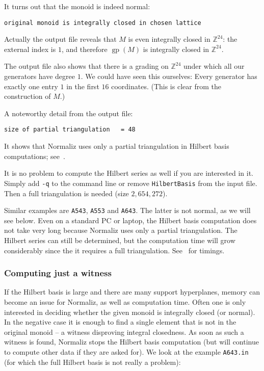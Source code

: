\documentclass[12pt,a4paper]{scrartcl}
\theoremstyle{definition}
\def\ZZ{{\mathbb Z}}
\DeclareMathOperator{\gp}{gp}
\begin{document}
It turns out that the monoid is indeed normal:
\begin{Verbatim}
original monoid is integrally closed in chosen lattice
\end{Verbatim}
Actually the output file reveals that $M$ is even integrally closed in $\ZZ^{24}$: the external index is $1$, and therefore $\gp(M)$ is integrally closed in $\ZZ^{24} $.

The output file also shows that there is a grading on $\ZZ^{24}$ under which all our generators have degree $1$. We could have seen this ourselves: Every generator has exactly one entry $1$ in the first $16$ coordinates. (This is clear from the construction of $M$.)

A noteworthy detail from the output file:
\begin{Verbatim}
size of partial triangulation   = 48
\end{Verbatim}
It shows that Normaliz uses only a partial triangulation in Hilbert basis computations; see~\cite{BHIKS}.

It is no problem to compute the Hilbert series as well if you are interested in it. Simply add \verb|-q| to the command line or remove \verb|HilbertBasis| from the input file. Then a full triangulation is needed (size $2,654,272$).

Similar examples are \verb|A543|, \verb|A553| and \verb|A643|. The latter is not normal, as we will see below. Even on a standard PC or laptop, the Hilbert basis computation does not take very long because Normaliz uses only a partial triangulation. The Hilbert series can still be determined, but the computation time will grow considerably since the it requires a full triangulation. See~\cite{BIS} for timings.

\subsubsection{Computing just a witness}\label{IsIC}

If the Hilbert basis is large and there are many support hyperplanes, memory can become an issue for Normaliz, as well as computation time. Often one is only interested in deciding whether the given monoid is integrally closed (or normal). In the negative case it is enough to find a single element that is not in the original monoid -- a witness disproving integral closedness. As soon as such a witness is found, Normaliz stops the Hilbert basis computation (but will continue to compute other data if they are asked for). We look at the example \verb|A643.in| (for which the full Hilbert basis is not really a problem):
\end{document}
